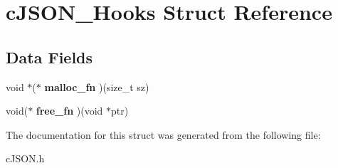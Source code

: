 \hypertarget{structc_j_s_o_n___hooks}{}\section{c\+J\+S\+O\+N\+\_\+\+Hooks Struct Reference}
\label{structc_j_s_o_n___hooks}
\subsection*{Data Fields}
\begin{DoxyCompactItemize}
\item 
\mbox{\label{structc_j_s_o_n___hooks_a7f7cfcc2ea2d783405e6f4f6eab99ec7}} 
void $\ast$($\ast$ {\bfseries malloc\+\_\+fn} )(size\+\_\+t sz)
\item 
\mbox{\label{structc_j_s_o_n___hooks_a53e4e91f1e224c1e78c5d1fff7039372}} 
void($\ast$ {\bfseries free\+\_\+fn} )(void $\ast$ptr)
\end{DoxyCompactItemize}


The documentation for this struct was generated from the following file\+:\begin{DoxyCompactItemize}
\item 
c\+J\+S\+O\+N.\+h\end{DoxyCompactItemize}
